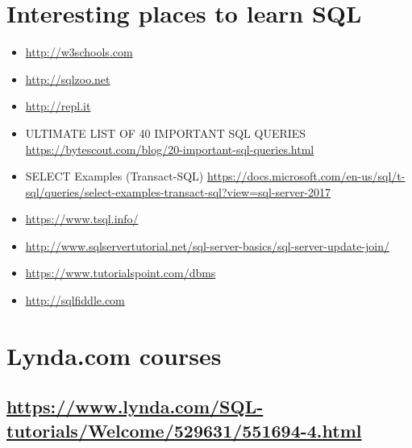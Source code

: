 \section  * {Interesting places to learn SQL}

\begin{itemize}
\item \url{http://w3schools.com}
\item \url{http://sqlzoo.net} 
\item \url{http://repl.it} 
\item ULTIMATE LIST OF 40 IMPORTANT SQL QUERIES 
\subitem \url{https://bytescout.com/blog/20-important-sql-queries.html}
\item SELECT Examples (Transact-SQL) \subitem \url{https://docs.microsoft.com/en-us/sql/t-sql/queries/select-examples-transact-sql?view=sql-server-2017}
\item \url{https://www.tsql.info/}
\item \url{http://www.sqlservertutorial.net/sql-server-basics/sql-server-update-join/}

\item \url{https://www.tutorialspoint.com/dbms}

\item \url{http://sqlfiddle.com}

\end{itemize}

\section  * {Lynda.com courses}
\subsection {\url{https://www.lynda.com/SQL-tutorials/Welcome/529631/551694-4.html}}